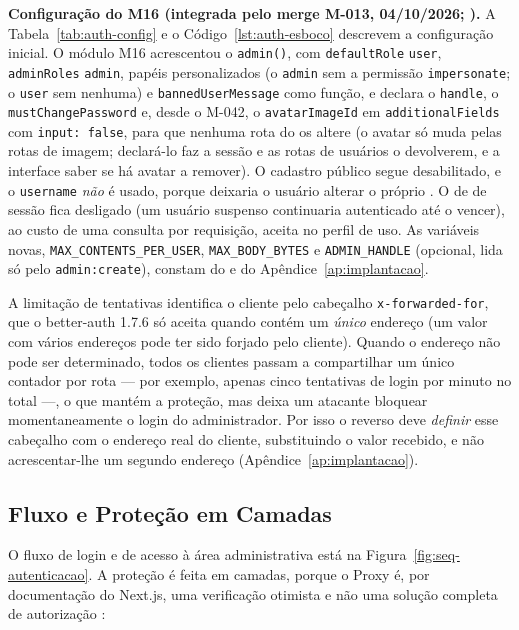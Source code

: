 \textbf{Configuração do M16 (integrada pelo merge M-013, 04/10/2026; ).} A Tabela~\ref{tab:auth-config} e o Código~\ref{lst:auth-esboco} descrevem a configuração inicial. O módulo M16 acrescentou o  \texttt{admin()}, com \texttt{defaultRole} \texttt{user}, \texttt{adminRoles} \texttt{admin}, papéis personalizados (o \texttt{admin} sem a permissão \texttt{impersonate}; o \texttt{user} sem nenhuma) e \texttt{bannedUserMessage} como função, e declara o \texttt{handle}, o \texttt{mustChangePassword} e, desde o M-042, o \texttt{avatarImageId} em \texttt{additionalFields} com \texttt{input: false}, para que nenhuma rota do  os altere (o avatar só muda pelas rotas de imagem; declará-lo faz a sessão e as rotas de usuários o devolverem, e a interface saber se há avatar a remover). O cadastro público segue desabilitado, e o  \texttt{username} \emph{não} é usado, porque deixaria o usuário alterar o próprio . O  de  de sessão fica desligado (um usuário suspenso continuaria autenticado até o  vencer), ao custo de uma consulta por requisição, aceita no perfil de uso. As variáveis novas, \texttt{MAX\_CONTENTS\_PER\_USER}, \texttt{MAX\_BODY\_BYTES} e \texttt{ADMIN\_HANDLE} (opcional, lida só pelo \texttt{admin:create}), constam do  e do Apêndice~\ref{ap:implantacao}.

A limitação de tentativas identifica o cliente pelo cabeçalho \texttt{x-forwarded-for}, que o better-auth 1.7.6 só aceita quando contém um \emph{único} endereço (um valor com vários endereços pode ter sido forjado pelo cliente). Quando o endereço não pode ser determinado, todos os clientes passam a compartilhar um único contador por rota --- por exemplo, apenas cinco tentativas de login por minuto no total ---, o que mantém a proteção, mas deixa um atacante bloquear momentaneamente o login do administrador. Por isso o  reverso deve \emph{definir} esse cabeçalho com o endereço real do cliente, substituindo o valor recebido, e não acrescentar-lhe um segundo endereço (Apêndice~\ref{ap:implantacao}).

\subsection{Fluxo e Proteção em Camadas}

O fluxo de login e de acesso à área administrativa está na Figura~\ref{fig:seq-autenticacao}. A proteção é feita em camadas, porque o Proxy é, por documentação do Next.js, uma verificação otimista e não uma solução completa de autorização \cite{nextjsdocs}:

